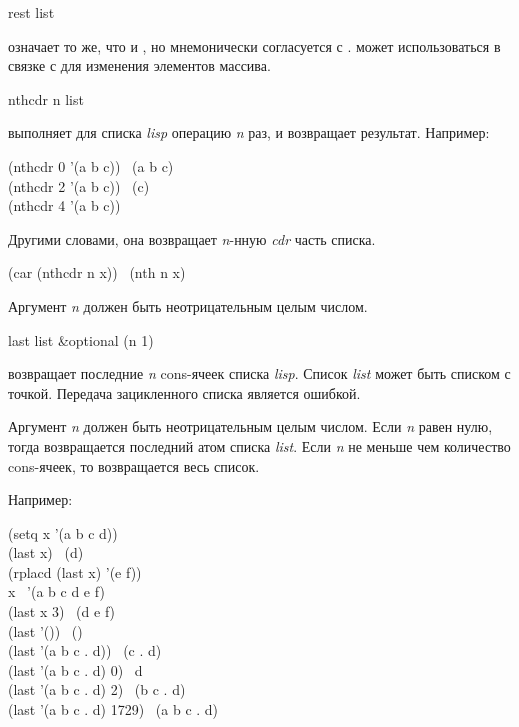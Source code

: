 \begin{defun}[Функция]
rest list

 означает то же, что и , но мнемонически согласуется с
.
 может использоваться в связке с  для изменения элементов
массива.
\end{defun}

\begin{defun}[Функция]
nthcdr n list

 выполняет для
списка \emph{lisp} операцию  \emph{n} раз, и возвращает результат.
Например:
\begin{lisp}
(nthcdr 0 '(a b c)) \EV\ (a b c) \\
(nthcdr 2 '(a b c)) \EV\ (c) \\
(nthcdr 4 '(a b c)) \EV\ {\emptylist}
\end{lisp}
Другими словами, она возвращает \emph{n}-нную \emph{cdr} часть списка.

\begin{lisp}
(car (nthcdr n x)) \EQ\ (nth n x)
\end{lisp}
Аргумент \emph{n} должен быть неотрицательным целым числом.
\end{defun}

\begin{defun}[Функция]
last list &optional (n 1)

 возвращает последние \emph{n} cons-ячеек списка \emph{lisp}. Список
\emph{list} может быть списком с точкой. Передача зацикленного списка является
ошибкой.

Аргумент \emph{n} должен быть неотрицательным целым числом.
Если \emph{n} равен нулю, тогда возвращается последний атом списка
\emph{list}. Если \emph{n} не меньше чем количество cons-ячеек, то возвращается
весь список.

Например:
\begin{lisp}
(setq x '(a b c d)) \\
(last x) \EV\ (d) \\
(rplacd (last x) '(e f)) \\
x \EV\ '(a b c d e f) \\
(last x 3) \EV\ (d e f) \\
(last '()) \EV\ () \\
(last '(a b c . d)) \EV\ (c . d) \\
(last '(a b c . d) 0) \EV\ d \\
(last '(a b c . d) 2) \EV\ (b c . d) \\
(last '(a b c . d) 1729) \EV\ (a b c . d)
\end{lisp}
\end{defun}

